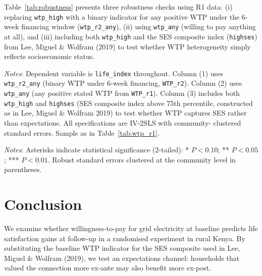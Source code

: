 \documentclass[letter,12pt]{article}
\newcommand{\starnote}{
  \noindent\emph{Notes}: Asterisks indicate statistical significance (2-tailed):
  * $P < 0.10$; ** $P < 0.05$; *** $P < 0.01$.
  Robust standard errors clustered at the community level in parentheses.
}
\begin{document}
Table~\ref{tab:robustness} presents three robustness checks using R1 data:
(i) replacing \texttt{wtp\_high} with a binary indicator for any positive WTP
under the 6-week financing window (\texttt{wtp\_r2\_any}), (ii) using
\texttt{wtp\_any} (willing to pay anything at all), and (iii) including both
\texttt{wtp\_high} and the SES composite index (\texttt{highses}) from
Lee, Miguel \& Wolfram (2019) to test whether WTP heterogeneity simply
reflects socioeconomic status.

\clearpage
{}

\begin{table}[H]
  \centering
  \caption{\textbf{Robustness: Alternative WTP Measures and SES Control --- R1 (2016)}}
  \label{tab:robustness}
  \vspace{0.5em}
  
  \vspace{0.5em}
  \begin{minipage}{\linewidth}
    \small
    \emph{Notes}: Dependent variable is \texttt{life\_index} throughout.
    Column (1) uses \texttt{wtp\_r2\_any} (binary WTP under 6-week financing,
    \texttt{WTP\_r2}). Column (2) uses \texttt{wtp\_any} (any positive stated WTP
    from \texttt{WTP\_r1}). Column (3) includes both \texttt{wtp\_high} and
    \texttt{highses} (SES composite index above 75th percentile, constructed
    as in Lee, Miguel \& Wolfram 2019) to test whether WTP captures SES
    rather than expectations. All specifications are IV-2SLS with community-
    clustered standard errors. Sample as in Table~\ref{tab:wtp_r1}.
    \starnote
  \end{minipage}
\end{table}

\restoregeometry

\section{Conclusion}

We examine whether willingness-to-pay for grid electricity at baseline
predicts life satisfaction gains at follow-up in a randomised experiment in
rural Kenya. By substituting the baseline WTP indicator for the SES composite
used in Lee, Miguel \& Wolfram (2019), we test an expectations channel:
households that valued the connection more ex-ante may also benefit more
ex-post.
\end{document}
